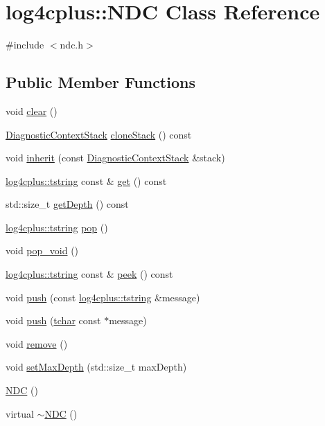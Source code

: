 \hypertarget{classlog4cplus_1_1NDC}{\section{log4cplus\-:\-:N\-D\-C Class Reference}
\label{classlog4cplus_1_1NDC}
}


{\ttfamily \#include $<$ndc.\-h$>$}

\subsection*{Public Member Functions}
\begin{DoxyCompactItemize}
\item 
void \hyperlink{classlog4cplus_1_1NDC_a822956761c830e6b9c37795fc0252211}{clear} ()
\item 
\hyperlink{namespacelog4cplus_ac62a7721683971c9b4f2b697aa7f03fb}{Diagnostic\-Context\-Stack} \hyperlink{classlog4cplus_1_1NDC_a7a41cf75e0c46a6529dbd17755c5a97b}{clone\-Stack} () const 
\item 
void \hyperlink{classlog4cplus_1_1NDC_a64169c244e495627d267f8d2d1105d32}{inherit} (const \hyperlink{namespacelog4cplus_ac62a7721683971c9b4f2b697aa7f03fb}{Diagnostic\-Context\-Stack} \&stack)
\item 
\hyperlink{namespacelog4cplus_a3c9287f6ebcddc50355e29d71152117b}{log4cplus\-::tstring} const \& \hyperlink{classlog4cplus_1_1NDC_a58701f2f6eb7c75963c1edd1b6d79ad9}{get} () const 
\item 
std\-::size\-\_\-t \hyperlink{classlog4cplus_1_1NDC_a87b46fd51e682014337868fa7a8d9257}{get\-Depth} () const 
\item 
\hyperlink{namespacelog4cplus_a3c9287f6ebcddc50355e29d71152117b}{log4cplus\-::tstring} \hyperlink{classlog4cplus_1_1NDC_a3f446e2479800b222b31cf7e30628c41}{pop} ()
\item 
void \hyperlink{classlog4cplus_1_1NDC_ac5334784c1ddcc371d0140f5d97a6a1e}{pop\-\_\-void} ()
\item 
\hyperlink{namespacelog4cplus_a3c9287f6ebcddc50355e29d71152117b}{log4cplus\-::tstring} const \& \hyperlink{classlog4cplus_1_1NDC_a4495adedb1c656f4199b9013e2521df9}{peek} () const 
\item 
void \hyperlink{classlog4cplus_1_1NDC_a5ce2b0d8e4c225613fdd8a642a01c992}{push} (const \hyperlink{namespacelog4cplus_a3c9287f6ebcddc50355e29d71152117b}{log4cplus\-::tstring} \&message)
\item 
void \hyperlink{classlog4cplus_1_1NDC_a5b4fb3774bbf66b9d8c995a57ee26feb}{push} (\hyperlink{namespacelog4cplus_a7b80b5711ae9e7a1ddd97dbaefbe3583}{tchar} const $\ast$message)
\item 
void \hyperlink{classlog4cplus_1_1NDC_a43f2d8571dc52f6dc2bd737bb3f88099}{remove} ()
\item 
void \hyperlink{classlog4cplus_1_1NDC_af905c21dfc8a4aedb0ac46a6a66936ff}{set\-Max\-Depth} (std\-::size\-\_\-t max\-Depth)
\item 
\hyperlink{classlog4cplus_1_1NDC_a8da3dcc190abd896c5f73cf1b968251f}{N\-D\-C} ()
\item 
virtual \hyperlink{classlog4cplus_1_1NDC_a574bfc5324baa601923df750a65e5c48}{$\sim$\-N\-D\-C} ()
\end{DoxyCompactItemize}
